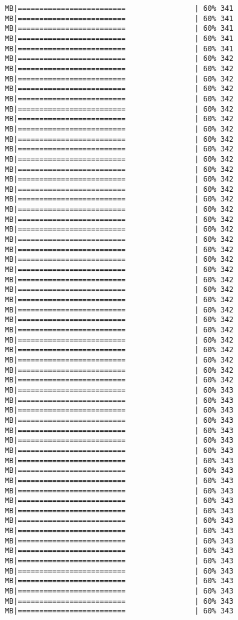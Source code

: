 \documentclass[
]{article}
\begin{document}
\begin{verbatim}
MB|=========================                | 60% 341 MB|=========================                | 60% 341 MB|=========================                | 60% 341 MB|=========================                | 60% 341 MB|=========================                | 60% 341 MB|=========================                | 60% 342 MB|=========================                | 60% 342 MB|=========================                | 60% 342 MB|=========================                | 60% 342 MB|=========================                | 60% 342 MB|=========================                | 60% 342 MB|=========================                | 60% 342 MB|=========================                | 60% 342 MB|=========================                | 60% 342 MB|=========================                | 60% 342 MB|=========================                | 60% 342 MB|=========================                | 60% 342 MB|=========================                | 60% 342 MB|=========================                | 60% 342 MB|=========================                | 60% 342 MB|=========================                | 60% 342 MB|=========================                | 60% 342 MB|=========================                | 60% 342 MB|=========================                | 60% 342 MB|=========================                | 60% 342 MB|=========================                | 60% 342 MB|=========================                | 60% 342 MB|=========================                | 60% 342 MB|=========================                | 60% 342 MB|=========================                | 60% 342 MB|=========================                | 60% 342 MB|=========================                | 60% 342 MB|=========================                | 60% 342 MB|=========================                | 60% 342 MB|=========================                | 60% 342 MB|=========================                | 60% 342 MB|=========================                | 60% 342 MB|=========================                | 60% 342 MB|=========================                | 60% 343 MB|=========================                | 60% 343 MB|=========================                | 60% 343 MB|=========================                | 60% 343 MB|=========================                | 60% 343 MB|=========================                | 60% 343 MB|=========================                | 60% 343 MB|=========================                | 60% 343 MB|=========================                | 60% 343 MB|=========================                | 60% 343 MB|=========================                | 60% 343 MB|=========================                | 60% 343 MB|=========================                | 60% 343 MB|=========================                | 60% 343 MB|=========================                | 60% 343 MB|=========================                | 60% 343 MB|=========================                | 60% 343 MB|=========================                | 60% 343 MB|=========================                | 60% 343 MB|=========================                | 60% 343 MB|=========================                | 60% 343 MB|=========================                | 60% 343 MB|=========================                | 60% 343 
\end{verbatim}
\end{document}

